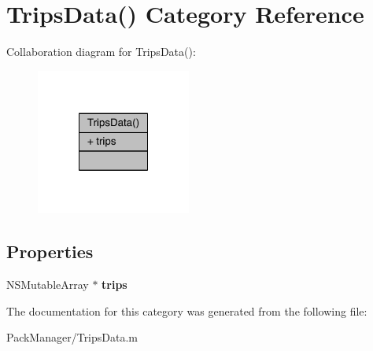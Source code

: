 \hypertarget{category_trips_data_07_08}{\section{Trips\-Data() Category Reference}
\label{category_trips_data_07_08}
}


Collaboration diagram for Trips\-Data()\-:\nopagebreak
\begin{figure}[H]
\begin{center}
\leavevmode
\includegraphics[width=144pt]{category_trips_data_07_08__coll__graph}
\end{center}
\end{figure}
\subsection*{Properties}
\begin{DoxyCompactItemize}
\item 
\hypertarget{category_trips_data_07_08_ad32a793f3e7c3eaa529ea0c57fef9b42}{N\-S\-Mutable\-Array $\ast$ {\bfseries trips}}\label{category_trips_data_07_08_ad32a793f3e7c3eaa529ea0c57fef9b42}

\end{DoxyCompactItemize}


The documentation for this category was generated from the following file\-:\begin{DoxyCompactItemize}
\item 
Pack\-Manager/Trips\-Data.\-m\end{DoxyCompactItemize}
